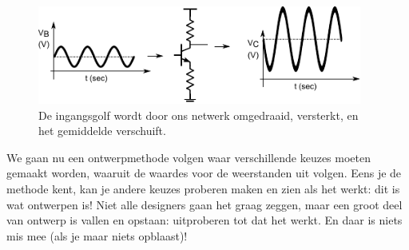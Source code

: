 \documentclass{article}
\begin{document}
				\begin{figure}[htbp]
					\centering
					\includegraphics[width=0.95\textwidth]{golven}
					\caption{De ingangsgolf wordt door ons netwerk omgedraaid, versterkt, en het gemiddelde verschuift.}
					\label{fig:golven}
				\end{figure}

				We gaan nu een ontwerpmethode volgen waar verschillende keuzes moeten gemaakt worden, waaruit de waardes voor de weerstanden uit volgen. Eens je de methode kent, kan je andere keuzes proberen maken en zien als het werkt: dit is wat ontwerpen is! Niet alle designers gaan het graag zeggen, maar een groot deel van ontwerp is vallen en opstaan: uitproberen tot dat het werkt. En daar is niets mis mee (als je maar niets opblaast)!
\end{document}
